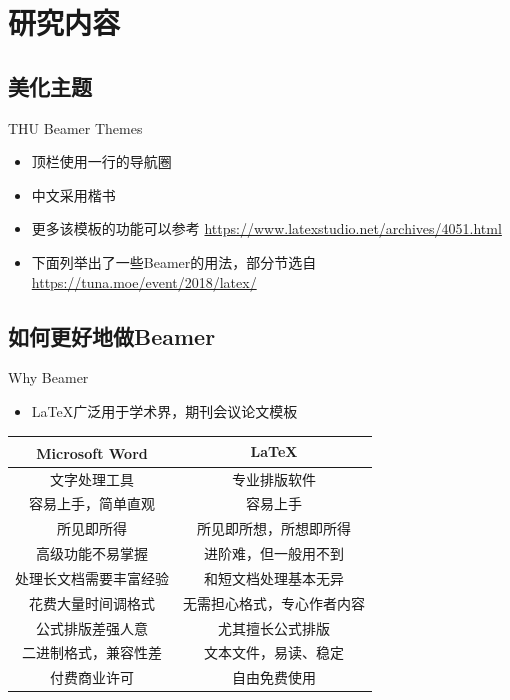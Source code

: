 \documentclass{beamer}
\begin{document}
	
	\section{研究内容}
	
	\subsection{美化主题}
	
	\begin{frame}{THU Beamer Themes}
		\begin{itemize}
			\item 顶栏使用一行的导航圈
			\item 中文采用楷书
			\item 更多该模板的功能可以参考 \url{https://www.latexstudio.net/archives/4051.html}
			\item 下面列举出了一些Beamer的用法，部分节选自 \url{https://tuna.moe/event/2018/latex/}
		\end{itemize}
	\end{frame}
	
	\subsection{如何更好地做Beamer}
	
	\begin{frame}{Why Beamer}
		\begin{itemize}
			\item \LaTeX 广泛用于学术界，期刊会议论文模板
		\end{itemize}
		\begin{table}[h]
			\centering
			\begin{tabular}{c|c}
				Microsoft\textsuperscript{\textregistered}  Word & \LaTeX \\
				\hline
				文字处理工具 & 专业排版软件 \\
				容易上手，简单直观 & 容易上手 \\
				所见即所得 & 所见即所想，所想即所得 \\
				高级功能不易掌握 & 进阶难，但一般用不到 \\
				处理长文档需要丰富经验 & 和短文档处理基本无异 \\
				花费大量时间调格式 & 无需担心格式，专心作者内容 \\
				公式排版差强人意 & 尤其擅长公式排版 \\
				二进制格式，兼容性差 & 文本文件，易读、稳定 \\
				付费商业许可 & 自由免费使用 \\
			\end{tabular}
		\end{table}
	\end{frame}
	
\end{document}
